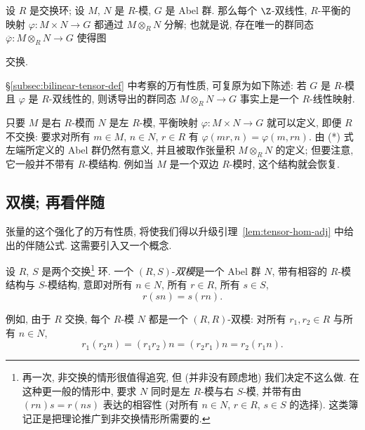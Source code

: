 \begin{lemma}\label{lem:balanced-factors-tensor}
设 $R$ 是交换环; 设 $M$, $N$ 是 $R$-模, $G$ 是 Abel 群. 那么每个 $\Z$-双线性, $R$-平衡的映射 $\varphi:M\times N\to G$ 都通过 $M\otimes_R N$ 分解; 也就是说, 存在唯一的群同态 $\overline{\varphi}:M\otimes_R N\to G$ 使得图
\begin{center}
\end{center}
交换.
\end{lemma}

\S\ref{subsec:bilinear-tensor-def} 中考察的万有性质, 可复原为如下陈述: 若 $G$ 是 $R$-模且 $\varphi$ 是 $R$-双线性的, 则诱导出的群同态 $M\otimes_R N\to G$ 事实上是一个 $R$-线性映射.

\begin{remark}\label{rmk:balanced-noncommutative}
只要 $M$ 是右 $R$-模而 $N$ 是左 $R$-模, 平衡映射 $\varphi:M\times N\to G$ 就可以定义, 即便 $R$ 不交换: 要求对所有 $m\in M$, $n\in N$, $r\in R$ 有 $\varphi(mr,n)=\varphi(m,rn)$. 由 (*) 式左端所定义的 Abel 群仍然有意义, 并且被取作张量积 $M\otimes_R N$ 的定义; 但要注意, 它一般并不带有 $R$-模结构. 例如当 $M$ 是一个双边 $R$-模时, 这个结构就会恢复.
\end{remark}

\subsection{双模; 再看伴随}
\label{subsec:bimodules-adjunction}

张量的这个强化了的万有性质, 将使我们得以升级引理~\ref{lem:tensor-hom-adj} 中给出的伴随公式. 这需要引入又一个概念.

\begin{definition}\label{def:bimodule}
设 $R$, $S$ 是两个交换\footnote{再一次, 非交换的情形很值得追究, 但 (并非没有顾虑地) 我们决定不这么做. 在这种更一般的情形中, 要求 $N$ 同时是左 $R$-模与右 $S$-模, 并带有由 $(rn)s=r(ns)$ 表达的相容性 (对所有 $n\in N$, $r\in R$, $s\in S$ 的选择). 这类簿记正是把理论推广到非交换情形所需要的.} 环. 一个 $(R,S)$-\emph{双模}是一个 Abel 群 $N$, 带有相容的 $R$-模结构与 $S$-模结构, 意即对所有 $n\in N$, 所有 $r\in R$, 所有 $s\in S$,
\[
r(sn)=s(rn).
\]
\end{definition}

例如, 由于 $R$ 交换, 每个 $R$-模 $N$ 都是一个 $(R,R)$-双模: 对所有 $r_1,r_2\in R$ 与所有 $n\in N$,
\[
r_1(r_2n)=(r_1r_2)n=(r_2r_1)n=r_2(r_1n).
\]

